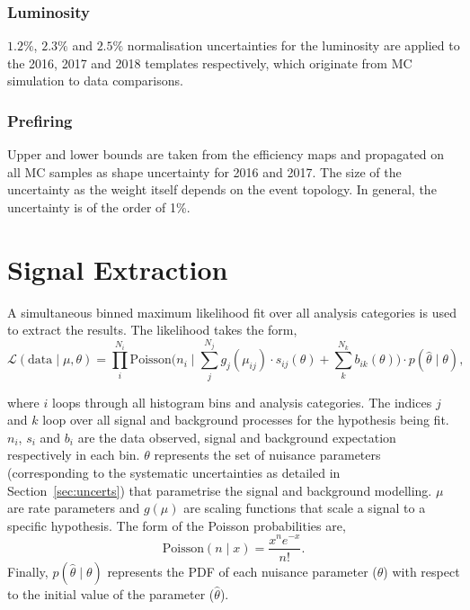 \subsubsection{Luminosity}
$1.2\%$, $2.3\%$ and $2.5\%$ normalisation uncertainties for the luminosity are applied to the 2016, 2017 and 2018 templates respectively, which originate from MC simulation to data comparisons.

\subsubsection{Prefiring}
Upper and lower bounds are taken from the efficiency maps and propagated on all \ac{MC} samples as shape uncertainty for 2016 and 2017.
The size of the uncertainty as the weight itself depends on the event topology. 
In general, the uncertainty is of the order of 1\%.

\section{Signal Extraction}
\label{sec:sig_ext}

A simultaneous binned maximum likelihood fit over all analysis categories is used to extract the results.
The likelihood takes the form,
\begin{equation}
\mathcal{L}(\text{data}\mid\mu,\theta) = \prod_{i}^{N_{i}} \text{Poisson} \Big(n_{i} \mid \sum_{j}^{N_{j}} g_{j}(\mu_{ij}) \cdot s_{ij}(\theta) + \sum_{k}^{N_{k}} b_{ik}(\theta)\Big) \cdot p(\hat{\theta} \mid \theta),
\label{eqn:likelihood}
\end{equation}

where $i$ loops through all histogram bins and analysis categories.
The indices $j$ and $k$ loop over all signal and background processes for the hypothesis being fit.
$n_i$, $s_i$ and $b_i$ are the data observed, signal and background expectation respectively in each bin.
$\theta$ represents the set of nuisance parameters (corresponding to the systematic uncertainties as detailed in Section~\ref{sec:uncerts}) that parametrise the signal and background modelling.
$\mu$ are rate parameters and $g(\mu)$ are scaling functions that scale a signal to a specific hypothesis.
The form of the Poisson probabilities are,
\begin{equation}
\text{Poisson} (n \mid x) = \frac{x^{n}e^{-x}}{n!}.
\end{equation}
Finally, $p(\hat{\theta} \mid \theta)$ represents the \ac{PDF} of each nuisance parameter ($\theta$) with respect to the initial value of the parameter ($\hat{\theta}$). \\

